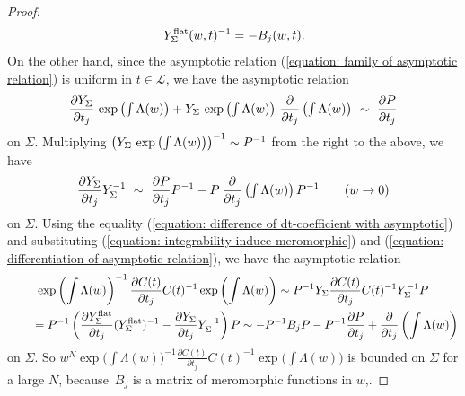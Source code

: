\documentclass[pdftex]{sigma}
\numberwithin{equation}{section}
\begin{document}
\begin{proof}
\begin{equation}
 \, Y^{\rm flat}_{\Sigma}(w,t)^{-1}
 =-B_j(w,t).
\end{equation}
On the other hand,
since the asymptotic relation (\ref{equation: family of asymptotic relation})
is uniform in $t\in{\mathcal L}$,
we have the asymptotic relation
\[
 \frac {\partial Y_{\Sigma}} {\partial t_j} \,
 \exp \left( \hbox{$\int\Lambda(w)$} \right)
 +Y_{\Sigma} \, \exp \left( \hbox{$\int\Lambda(w)$} \right) \,
 \frac { \partial } {\partial t_j} \left( \hbox{$\int\Lambda(w)$} \right)
 \ \sim \ \frac {\partial P} {\partial t_j}
\]
on $\Sigma$.
Multiplying
$\left( Y_{\Sigma} \, \exp \left( \hbox{$\int\Lambda(w)$} \right) \right)^{-1}\sim P^{-1}$
from the right to the above, we have
\begin{equation}
\label{equation: differentiation of asymptotic relation}
 \frac{\partial Y_{\Sigma}} {\partial t_j} Y_{\Sigma}^{-1}
 \ \sim \
 \frac{\partial P}{\partial t_j} P^{-1}
 -P \: \frac{\partial}{\partial t_j} \left( \hbox{$\int\Lambda(w)$} \right) P^{-1}
 \qquad
 (w\to 0)
\end{equation}
on $\Sigma$.
Using the equality (\ref{equation: difference of dt-coefficient with asymptotic})
and substituting (\ref{equation: integrability induce meromorphic})
and (\ref{equation: differentiation of asymptotic relation}),
we have the asymptotic relation
\begin{gather*}
 \exp \left( \int\Lambda(w) \right) ^{-1} \frac{\partial C(t)} {\partial t_j} C(t)^{-1}
 \exp \left( \int\Lambda(w) \right)
\sim
 P^{-1} Y_{\Sigma} \frac{\partial C(t)} {\partial t_j}
 C(t)^{-1} Y_{\Sigma}^{-1} P
 \\
 \qquad{}=
 P^{-1} \left(
 \frac{\partial Y^{\rm flat}_{\Sigma}} {\partial t_j} (Y^{\mathrm{flat}}_{\Sigma})^{-1}
 -\frac{\partial Y_{\Sigma}} {\partial t_j} Y_{\Sigma}^{-1} \right) P
 \sim
 -P^{-1} B_j P
 -P^{-1} \frac{\partial P}{\partial t_j}
 +\frac{\partial }{\partial t_j} \left( \int\Lambda(w) \right)
\end{gather*}
on $\Sigma$.
So
$
w^N \exp \big( \int\Lambda(w) \big)^{-1}
\frac{\partial C(t)} {\partial t_j} C(t)^{-1}
\exp \big( \int\Lambda(w)\big)$
is bounded on $\Sigma$
for a large $N$,
because~$B_j$ is a matrix of meromorphic functions in $w$,.


\end{proof}
\end{document}
